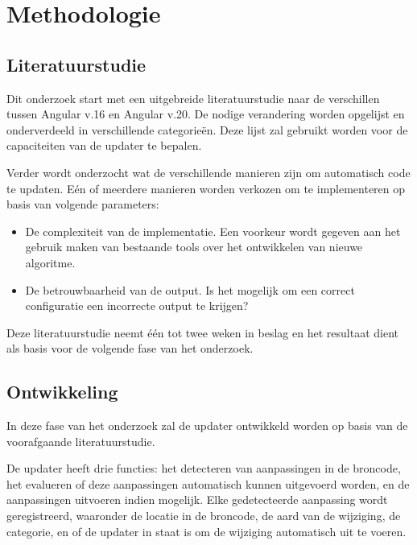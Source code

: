 \section{Methodologie}
\label{sec:methodologie}

\subsection{Literatuurstudie}
\label{sec:methodologie:literatuurstudie}

Dit onderzoek start met een uitgebreide literatuurstudie naar de verschillen tussen Angular v.16 en Angular v.20.
De nodige verandering worden opgelijst en onderverdeeld in verschillende categorieën.
Deze lijst zal gebruikt worden voor de capaciteiten van de updater te bepalen.

Verder wordt onderzocht wat de verschillende manieren zijn om automatisch code te updaten.
Eén of meerdere manieren worden verkozen om te implementeren op basis van volgende parameters:
\begin{itemize}
  \item De complexiteit van de implementatie. Een voorkeur wordt gegeven aan het gebruik maken van bestaande tools over het ontwikkelen van nieuwe algoritme.
  \item De betrouwbaarheid van de output. Is het mogelijk om een correct configuratie een incorrecte output te krijgen?
\end{itemize}

Deze literatuurstudie neemt één tot twee weken in beslag en het resultaat dient als basis voor de volgende fase van het onderzoek.

\subsection{Ontwikkeling}

In deze fase van het onderzoek zal de updater ontwikkeld worden op basis van de voorafgaande literatuurstudie.

De updater heeft drie functies: het detecteren van aanpassingen in de broncode, het evalueren of deze aanpassingen automatisch kunnen uitgevoerd worden, en de aanpassingen uitvoeren indien mogelijk.
Elke gedetecteerde aanpassing wordt geregistreerd, waaronder de locatie in de broncode, de aard van de wijziging, de categorie, en of de updater in staat is om de wijziging automatisch uit te voeren.

